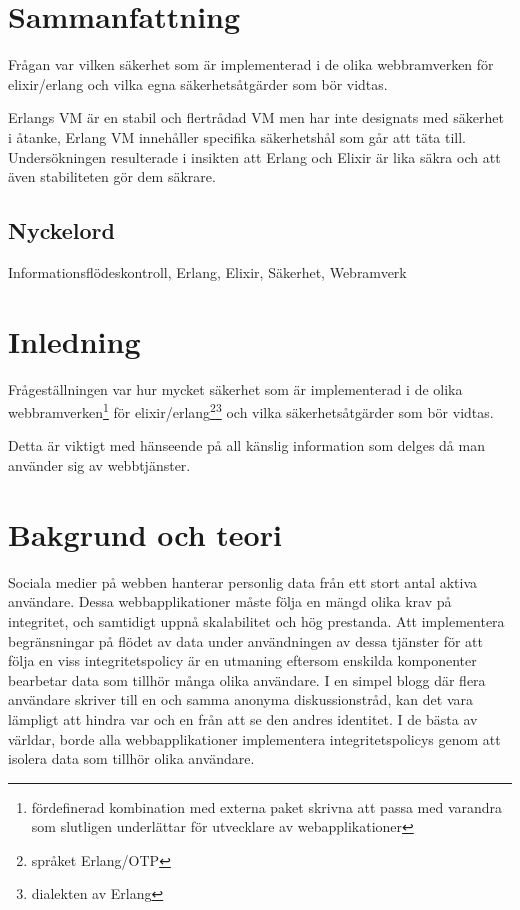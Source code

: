 \documentclass[12pt]{article}
\begin{document}
\maketitle

	 	 	 	 	
	
\section*{Sammanfattning}
Frågan var vilken säkerhet som är implementerad i de olika webbramverken för elixir/erlang och vilka egna säkerhetsåtgärder som bör vidtas.

Erlangs VM är en stabil och flertrådad VM men har inte designats med säkerhet i åtanke, Erlang VM innehåller specifika säkerhetshål som går att täta till.
Undersökningen resulterade i insikten att Erlang och Elixir är lika säkra och att även stabiliteten gör dem säkrare.
	
\subsection*{Nyckelord}
Informationsflödeskontroll, Erlang, Elixir, Säkerhet, Webramverk
	
\section{Inledning}

Frågeställningen var hur mycket säkerhet som är implementerad i de olika webbramverken\footnote{fördefinerad kombination med externa paket skrivna att passa med varandra som slutligen underlättar för utvecklare av webapplikationer} för elixir/erlang\footnote{språket Erlang/OTP\cite{erlang}}\footnote{dialekten av Erlang\cite{elixir}} och vilka säkerhetsåtgärder som bör vidtas.

Detta är viktigt med hänseende på all känslig information som delges då man använder sig av webbtjänster.\\



 \section{Bakgrund och teori}


Sociala medier på webben hanterar personlig data från ett stort antal aktiva användare.
Dessa webbapplikationer måste följa en mängd olika krav på integritet, och samtidigt uppnå skalabilitet och hög prestanda.
Att implementera begränsningar på flödet av data under användningen av dessa tjänster för att följa en viss integritetspolicy är en utmaning eftersom enskilda komponenter bearbetar data som tillhör många olika användare.
I en simpel blogg där flera användare skriver till en och samma anonyma diskussionstråd, kan det vara lämpligt att hindra var och en från att se den andres identitet.
I de bästa av världar, borde alla webbapplikationer implementera integritetspolicys genom att isolera data som tillhör olika användare.\\
\end{document}
